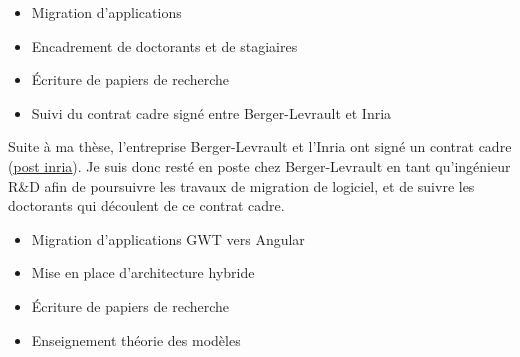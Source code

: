 \documentclass[10pt,a4paper,ragged2e,withhyper]{altacv}
\begin{document}


\makecvheader



\begin{itemize}
\item Migration d'applications
\item Encadrement de doctorants et de stagiaires
\item Écriture de papiers de recherche
\item Suivi du contrat cadre signé entre Berger-Levrault et Inria
\end{itemize}

Suite à ma thèse, l'entreprise Berger-Levrault et l'Inria ont signé un contrat cadre (\href{https://www.inria.fr/fr/berger-levrault-inria-partenariat-numerique-responsable}{\color{blue}\underline{post inria}}).
Je suis donc resté en poste chez Berger-Levrault en tant qu'ingénieur R\&D afin de poursuivre les travaux de migration de logiciel, et de suivre les doctorants qui découlent de ce contrat cadre.

\divider

\begin{itemize}
\item Migration d'applications GWT vers Angular
\item Mise en place d'architecture hybride
\item Écriture de papiers de recherche
\item Enseignement théorie des modèles
\end{itemize}
\end{document}
